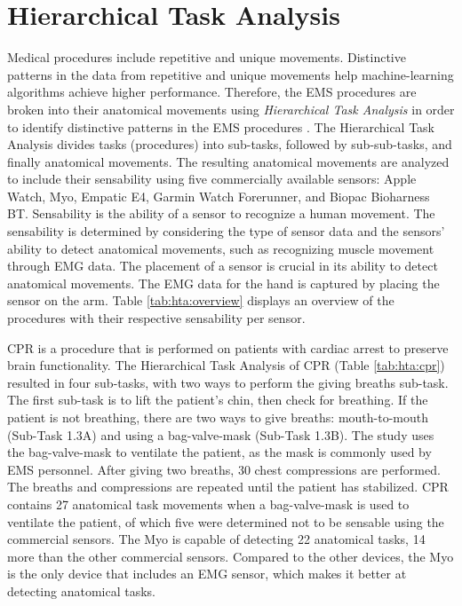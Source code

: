 \section{Hierarchical Task Analysis}
\label{sec:Approach:Hierarchical-Task-Analysis}
Medical procedures include repetitive and unique movements. Distinctive patterns in the data from repetitive and unique movements help machine-learning algorithms achieve higher performance. Therefore, the EMS procedures are broken into their anatomical movements using \emph{Hierarchical Task Analysis} in order to identify distinctive patterns in the EMS procedures \cite{kirwan1992guide}. The Hierarchical Task Analysis divides tasks (procedures) into sub-tasks, followed by sub-sub-tasks, and finally anatomical movements. The resulting anatomical movements are analyzed to include their sensability using five commercially available sensors: Apple Watch, Myo, Empatic E4, Garmin Watch Forerunner, and Biopac Bioharness BT. Sensability is the ability of a sensor to recognize a human movement. The sensability is determined by considering the type of sensor data and the sensors' ability to detect anatomical movements, such as recognizing muscle movement through EMG data. The placement of a sensor is crucial in its ability to detect anatomical movements. The EMG data for the hand is captured by placing the sensor on the arm. Table \ref{tab:hta:overview} displays an overview of the procedures with their respective sensability per sensor.
\par CPR is a procedure that is performed on patients with cardiac arrest to preserve brain functionality. The Hierarchical Task Analysis of CPR (Table \ref{tab:hta:cpr}) resulted in four sub-tasks, with two ways to perform the giving breaths sub-task. The first sub-task is to lift the patient's chin, then check for breathing. If the patient is not breathing, there are two ways to give breaths: mouth-to-mouth (Sub-Task 1.3A) and using a bag-valve-mask (Sub-Task 1.3B). The study uses the bag-valve-mask to ventilate the patient, as the mask is commonly used by EMS personnel. After giving two breaths, 30 chest compressions are performed. The breaths and compressions are repeated until the patient has stabilized. CPR contains 27 anatomical task movements when a bag-valve-mask is used to ventilate the patient, of which five were determined not to be sensable using the commercial sensors. The Myo is capable of detecting 22 anatomical tasks, 14 more than the other commercial sensors. Compared to the other devices, the Myo is the only device that includes an EMG sensor, which makes it better at detecting anatomical tasks.
